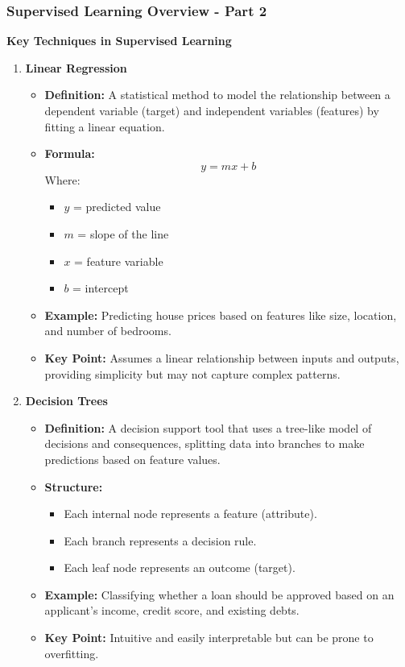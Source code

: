 \documentclass[aspectratio=169]{beamer}
\begin{document}
\begin{frame}[fragile]
    \frametitle{Supervised Learning Overview - Part 2}
    \textbf{Key Techniques in Supervised Learning}
    \begin{enumerate}
        \item \textbf{Linear Regression}
        \begin{itemize}
            \item \textbf{Definition:} A statistical method to model the relationship between a dependent variable (target) and independent variables (features) by fitting a linear equation.
            \item \textbf{Formula:} 
            \begin{equation}
                y = mx + b
            \end{equation}
            Where:
            \begin{itemize}
                \item $y$ = predicted value
                \item $m$ = slope of the line
                \item $x$ = feature variable
                \item $b$ = intercept
            \end{itemize}
            \item \textbf{Example:} Predicting house prices based on features like size, location, and number of bedrooms.
            \item \textbf{Key Point:} Assumes a linear relationship between inputs and outputs, providing simplicity but may not capture complex patterns.
        \end{itemize}

        \item \textbf{Decision Trees}
        \begin{itemize}
            \item \textbf{Definition:} A decision support tool that uses a tree-like model of decisions and consequences, splitting data into branches to make predictions based on feature values.
            \item \textbf{Structure:}
            \begin{itemize}
                \item Each internal node represents a feature (attribute).
                \item Each branch represents a decision rule.
                \item Each leaf node represents an outcome (target).
            \end{itemize}
            \item \textbf{Example:} Classifying whether a loan should be approved based on an applicant's income, credit score, and existing debts.
            \item \textbf{Key Point:} Intuitive and easily interpretable but can be prone to overfitting.
        \end{itemize}
    \end{enumerate}
\end{frame}
\end{document}
